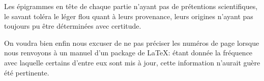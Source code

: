 Les épigrammes en tête de chaque partie n'ayant pas de prétentions scientifiques, le savant toléra le léger flou quant à leurs provenance, leurs origines n'ayant pas toujours pu être déterminées avec certitude.

On voudra bien enfin nous excuser de ne pas préciser les numéros de page lorsque nous renvoyons à un manuel d'un package de \LaTeX : étant donnée la fréquence avec laquelle certains d'entre eux sont mis à jour, cette information n'aurait guère été pertinente.
